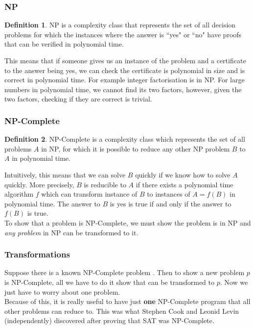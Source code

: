 \documentclass{article}
\theoremstyle{definition}
\newtheorem{definition}{Definition}[section]
\newcommand{\n}[0]{\\[\baselineskip]}
\begin{document}
\subsubsection{NP}
\begin{definition}
NP is a complexity class that represents the set of all decision problems for which the instances where the answer is ``yes" or ``no" have proofs that can be verified in polynomial time.
\end{definition}
\noindent
This means that if someone gives us an instance of the problem and a certificate to the answer being yes, we can check the certificate is polynomial in size and is correct in polynomial time. For example integer factorisation is in NP. For large numbers in polynomial time, we cannot find its two factors, however, given the two factors, checking if they are correct is trivial. 
\subsubsection{NP-Complete}
\begin{definition}
NP-Complete is a complexity class which represents the set of all problems $A$ in NP, for which it is possible to reduce any other NP problem $B$ to $A$ in polynomial time. 
\end{definition}
\noindent
Intuitively, this means that we can solve $B$ quickly if we know how to solve $A$ quickly. More precisely, $B$ is reducible to $A$ if there exists a polynomial time algorithm $f$ which can transform instance of $B$ to instances of $A = f(B)$ in polynomial time. The answer to $B$ is yes is true if and only if the answer to $f(B)$ is true.
\n
To show that a problem is NP-Complete, we must show the problem is in NP and \textit{any problem} in NP can be transformed to it.

\subsubsection{Transformations}
Suppose there is a known NP-Complete problem \Pi. Then to show a new problem $p$ is NP-Complete, all we have to do it show that \Pi can be transformed to $p$. Now we just have to worry about one problem. 
\n
Because of this, it is really useful to have just \textbf{one} NP-Complete program that all other problems can reduce to. This was what Stephen Cook and Leonid Levin (independently) discovered after proving that SAT was NP-Complete. 
\end{document}
